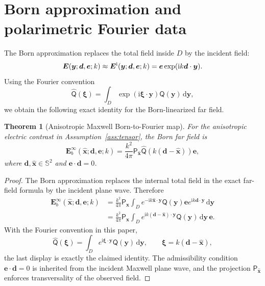 \documentclass[11pt]{article}
\numberwithin{equation}{section}
\newcommand{\Sph}{\mathbb{S}}
\newcommand{\ii}{\mathrm{i}}
\newcommand{\dd}{\,\mathrm d}
\newcommand{\vect}[1]{\bm{#1}}
\newcommand{\tens}[1]{\bm{\mathsf{#1}}}
\newcommand{\Qt}{\ensuremath{\tens{Q}}}
\theoremstyle{plain}
\newtheorem{theorem}{Theorem}[section]
\theoremstyle{definition}
\begin{document}
\section{Born approximation and polarimetric Fourier data}\label{sec:born}

The Born approximation replaces the total field inside $D$ by the incident field:
\begin{equation*}
  \vect{E}(\vect{y};\vect{d},\vect{e};k)\approx \vect{E}^{\rm i}(\vect{y};\vect{d},\vect{e};k)=\vect{e}\exp(\ii k \vect{d}\cdot \vect{y}).
\end{equation*}
Using the Fourier convention
\begin{equation*}
  \widehat{\Qt}(\vect{\xi})=\int_D\exp(\ii\vect{\xi}\cdot \vect{y})\Qt(\vect{y})\dd \vect{y},
\end{equation*}
we obtain the following exact identity for the Born-linearized far field.

\begin{theorem}[Anisotropic Maxwell Born-to-Fourier map]\label{thm:born_tensor}
For the anisotropic electric contrast in Assumption~\ref{ass:tensor}, the Born far field is
\begin{equation*}
  \vect{E}_b^\infty(\hat{\vect{x}};\vect{d},\vect{e};k)=\frac{k^2}{4\pi}\tens{P}_{\hat{\vect{x}}}\widehat{\Qt}(k(\vect{d}-\hat{\vect{x}}))\vect{e},
\end{equation*}
where $\vect{d},\hat{\vect{x}}\in\Sph^2$ and $\vect{e}\cdot\vect{d}=0$.
\end{theorem}

\begin{proof}
The Born approximation replaces the internal total field in the exact far-field formula by the incident plane wave.  Therefore
\begin{align*}
  \vect{E}_b^\infty(\hat{\vect{x}};\vect{d},\vect{e};k)
  &=\frac{k^2}{4\pi}\tens{P}_{\hat{\vect{x}}}
  \int_D e^{-\ii k\hat{\vect{x}}\cdot \vect{y}}
  \Qt(\vect{y})\vect{e}e^{\ii k\vect{d}\cdot \vect{y}}\dd \vect{y} \\
  &=\frac{k^2}{4\pi}\tens{P}_{\hat{\vect{x}}}
  \int_D e^{\ii k(\vect{d}-\hat{\vect{x}})\cdot\vect{y}}\Qt(\vect{y})\dd\vect{y}\,\vect{e} .
\end{align*}
With the Fourier convention in this paper,
\[
  \widehat{\Qt}(\vect{\xi})=\int_D e^{\ii\vect{\xi}\cdot\vect{y}}\Qt(\vect{y})\dd\vect{y},
  \qquad \vect{\xi}=k(\vect{d}-\hat{\vect{x}}),
\]
the last display is exactly the claimed identity.  The admissibility condition \(\vect{e}\cdot\vect{d}=0\) is inherited from the incident Maxwell plane wave, and the projection \(\tens{P}_{\hat{\vect{x}}}\) enforces transversality of the observed field.
\end{proof}
\end{document}
